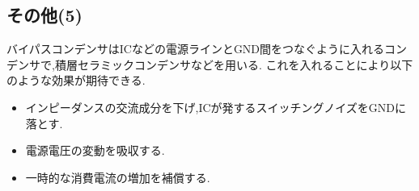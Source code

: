 \subsection{その他(5)}
バイパスコンデンサはICなどの電源ラインとGND間をつなぐように入れるコンデンサで,積層セラミックコンデンサなどを用いる.
これを入れることにより以下のような効果が期待できる.
\begin{itemize}
  \item インピーダンスの交流成分を下げ,ICが発するスイッチングノイズをGNDに落とす.
  \item 電源電圧の変動を吸収する.
  \item 一時的な消費電流の増加を補償する.
\end{itemize}
